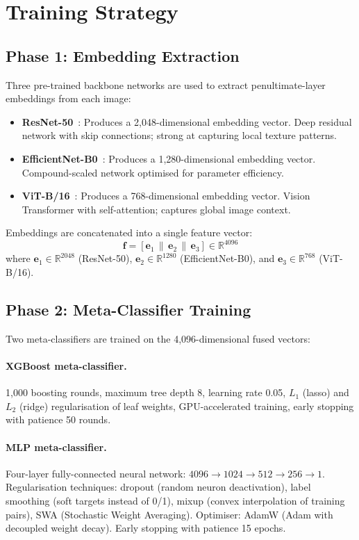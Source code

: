 \section{Training Strategy}\label{sec:training}

\subsection{Phase 1: Embedding Extraction}

Three pre-trained backbone networks are used to extract penultimate-layer embeddings from each image:

\begin{itemize}
    \item \textbf{ResNet-50}~\cite{he2016deep}: Produces a 2,048-dimensional embedding vector. Deep residual network with skip connections; strong at capturing local texture patterns.
    \item \textbf{EfficientNet-B0}~\cite{tan2019efficientnet}: Produces a 1,280-dimensional embedding vector. Compound-scaled network optimised for parameter efficiency.
    \item \textbf{ViT-B/16}~\cite{dosovitskiy2021image}: Produces a 768-dimensional embedding vector. Vision Transformer with self-attention; captures global image context.
\end{itemize}

Embeddings are concatenated into a single feature vector:
\[
\mathbf{f} = [\mathbf{e}_1 \,\|\, \mathbf{e}_2 \,\|\, \mathbf{e}_3] \in \mathbb{R}^{4096}
\]
where $\mathbf{e}_1 \in \mathbb{R}^{2048}$ (ResNet-50), $\mathbf{e}_2 \in \mathbb{R}^{1280}$ (EfficientNet-B0), and $\mathbf{e}_3 \in \mathbb{R}^{768}$ (ViT-B/16).

\subsection{Phase 2: Meta-Classifier Training}

Two meta-classifiers are trained on the 4,096-dimensional fused vectors:

\paragraph{XGBoost meta-classifier.}
1,000 boosting rounds, maximum tree depth 8, learning rate 0.05, $L_1$ (lasso) and $L_2$ (ridge) regularisation of leaf weights, GPU-accelerated training, early stopping with patience 50 rounds.

\paragraph{MLP meta-classifier.}
Four-layer fully-connected neural network: $4096 \to 1024 \to 512 \to 256 \to 1$. Regularisation techniques: dropout (random neuron deactivation), label smoothing (soft targets instead of 0/1), mixup (convex interpolation of training pairs), SWA (Stochastic Weight Averaging). Optimiser: AdamW (Adam with decoupled weight decay). Early stopping with patience 15 epochs.


